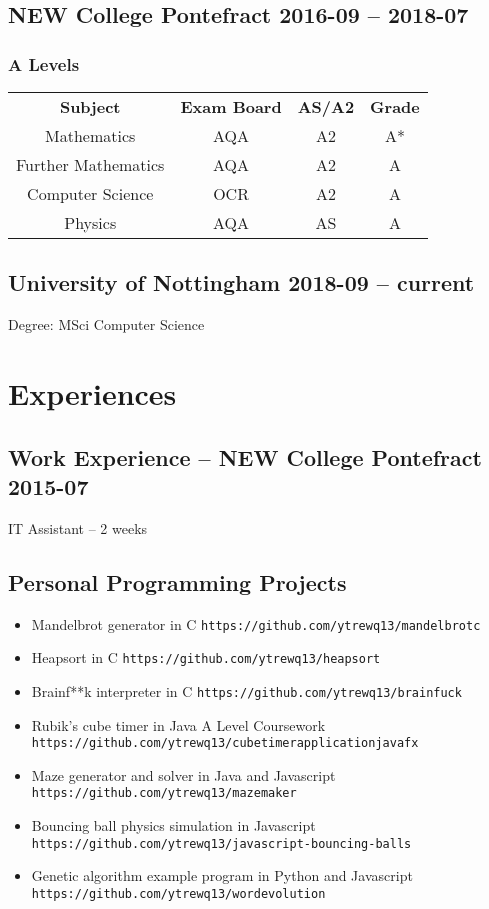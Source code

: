\documentclass[9pt]{extarticle}
\begin{document}
    \subsection{NEW College Pontefract
    \hfill 2016-09 -- 2018-07}
    \subsubsection{A Levels}
    \begin{tabular}{cccc}
        \textbf{Subject} & \textbf{Exam Board} & \textbf{AS/A2} & \textbf{Grade} \\
        Mathematics & AQA & A2 & A* \\
        Further Mathematics & AQA & A2 & A \\
        Computer Science & OCR & A2 & A \\
        Physics & AQA & AS & A
    \end{tabular}
    \subsection{University of Nottingham
    \hfill 2018-09 -- current}
    Degree: MSci Computer Science
    \section{Experiences}
    \subsection{Work Experience -- NEW College Pontefract
    \hfill 2015-07}
    IT Assistant
    --
    2 weeks
    \subsection{Personal Programming Projects}
    \begin{itemize}
        \item Mandelbrot generator in C
            \hfill
            \texttt{https://github.com/ytrewq13/mandelbrotc}
        \item Heapsort in C
            \hfill
            \texttt{https://github.com/ytrewq13/heapsort}
        \item Brainf**k interpreter in C
            \hfill
            \texttt{https://github.com/ytrewq13/brainfuck}
        \item Rubik's cube timer in Java
            \hfill
            A Level Coursework
            \hfill
            \texttt{https://github.com/ytrewq13/cubetimerapplicationjavafx}
        \item Maze generator and solver in Java and Javascript
            \hfill
            \texttt{https://github.com/ytrewq13/mazemaker}
        \item Bouncing ball physics simulation in Javascript
            \hfill
            \texttt{https://github.com/ytrewq13/javascript-bouncing-balls}
        \item Genetic algorithm example program in Python and Javascript
            \hfill
            \texttt{https://github.com/ytrewq13/wordevolution}
    \end{itemize}
\end{document}
